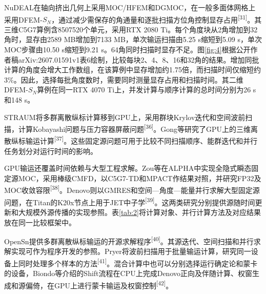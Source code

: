 \documentclass[UTF8, zihao=-4, fontset=none, a4paper]{ctexart}
\newcommand{\upcite}[1]{\textsuperscript{[#1]}}
\begin{document}
NuDEAL在轴向挤出几何上采用MOC/HFEM和DGMOC，在一般多面体网格上采用DFEM-$S_N$，通过减少需保存的角通量和逐批扫描方位角控制显存占用\upcite{31}。其三维C5G7算例含8507520个单元，采用RTX 2080 Ti。每个角度块从2角增加到32角时，显存由2589 MB增加到7133 MB，单次输运扫描由5.25 s缩短到5.09 s，单次MOC步骤由10.50 s缩短到9.21 s。64角同时扫描时显存不足。图\ref{fig:4}根据公开作者稿arXiv:2607.01591v1表6绘制，比较每块2、4、8、16和32角的结果。增加同批计算的角度会增大工作数组，在该算例中显存增加约1.75倍，而扫描时间仅缩短约3\%。因此，选择每批角度数时，需要同时测量显存占用和扫描时间。其二维DFEM-$S_N$算例在同一RTX 4070 Ti上，并发计算与顺序计算的总时间分别为26 s和148 s。

STRAUM将多群离散纵标计算移到GPU上，采用群块Krylov迭代和空间波前扫描，计算Kobayashi问题与压力容器屏蔽问题\upcite{36}。Gong等研究了GPU上的三维离散纵标输运计算\upcite{37}。这些固定源问题可用于比较不同扫描顺序、能群迭代和并行任务划分对运行时间的影响。

GPU输运还覆盖时间依赖与大型工程求解。Zou等在ALPHA中实现全隐式瞬态固定源MOC，采用棒级CMFD，以C5G7-TD和MPACT作结果对照，并研究FP32及MOC收敛容限\upcite{38}。Denovo则以GMRES和空间---角度---能量并行求解大型固定源问题，在Titan的K20x节点上用于JET中子学\upcite{39}。这两类研究分别提供源随时间更新和大规模外源传播的实现参照。表\ref{tab:2}将计算对象、并行计算方法及对应结果放在同一比较框架中。

OpenSn提供多群离散纵标输运的开源求解程序\upcite{40}。其源迭代、空间扫描和并行求解实现可作为程序开发的参照。Pryer将波前扫描用于批量输运计算，研究同一设备上同时处理多个样本的方法\upcite{41}。混合计算中也可以分别选择运行确定论和蒙卡的设备，Biondo等介绍的Shift流程在CPU上完成Denovo正向及伴随计算、权窗生成和源偏倚，在GPU上进行蒙卡输运及权窗控制\upcite{42}。
\end{document}
